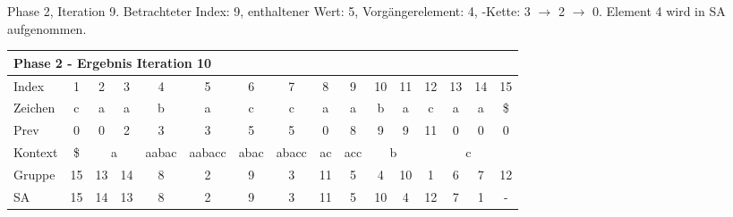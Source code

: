 \begin{table}[H]
\caption[Phase 2, Iteration 9]{Phase 2, Iteration 9. Betrachteter Index: 9, enthaltener Wert: 5, Vorgängerelement: 4, \prevpointer-Kette: 3 $\rightarrow$ 2 $\rightarrow$ 0. Element 4 wird in SA aufgenommen.}
\label{table_complex_example_2_9} 
\end{table}

\begin{table}[H]
\centering
\begin{adjustbox}{max width=\textwidth}
\centering
\begin{tabular}{lccccccccccccccc}
\multicolumn{16}{l}{Phase 2 - Ergebnis Iteration 10}                                                                                                                                                                                                                                                                                          \\ \hline
\multicolumn{1}{l|}{Index}   & 1                       & 2  & 3                       & 4                          & 5                           & 6                         & 7                          & 8                       & 9                        & 10                         & 11                      & 12  & 13  & 14  & 15  \\
\multicolumn{1}{l|}{Zeichen} & c                       & a  & a                       & b                          & a                           & c                         & c                          & a                       & a                        & b                          & a                       & c   & a   & a   & \$  \\
\multicolumn{1}{l|}{Prev}    & 0                       & 0  & 2                       & 3                          & 3                           & 5                         & 5                          & 0                       & 8                        & 9                          & 9                       & 11  & 0   & 0   & 0   \\ \hline
\multicolumn{1}{l|}{Kontext} & \multicolumn{1}{c|}{\$} & \multicolumn{2}{c|}{a}       & \multicolumn{1}{c|}{aabac} & \multicolumn{1}{c|}{aabacc} & \multicolumn{1}{c|}{abac} & \multicolumn{1}{c|}{abacc} & \multicolumn{1}{c|}{ac} & \multicolumn{1}{c|}{acc} & \multicolumn{2}{c|}{b}                               & \multicolumn{4}{c}{c} \\
\multicolumn{1}{l|}{Gruppe}  & \multicolumn{1}{c|}{15} & 13 & \multicolumn{1}{c|}{14} & \multicolumn{1}{c|}{8}     & \multicolumn{1}{c|}{2}      & \multicolumn{1}{c|}{9}    & \multicolumn{1}{c|}{3}     & \multicolumn{1}{c|}{11} & \multicolumn{1}{c|}{5}   & 4                          & \multicolumn{1}{c|}{10} & 1   & 6   & 7   & 12  \\
\multicolumn{1}{l|}{SA}      & \multicolumn{1}{c|}{15} & 14 & \multicolumn{1}{c|}{13} & \multicolumn{1}{c|}{8}     & \multicolumn{1}{c|}{2}      & \multicolumn{1}{c|}{9}    & \multicolumn{1}{c|}{3}     & \multicolumn{1}{c|}{11} & \multicolumn{1}{c|}{5}   & \cellcolor[HTML]{\green}10 & \multicolumn{1}{c|}{4}  & 12  & 7   & 1   & -  
\end{tabular}
\end{adjustbox}


\end{table}
